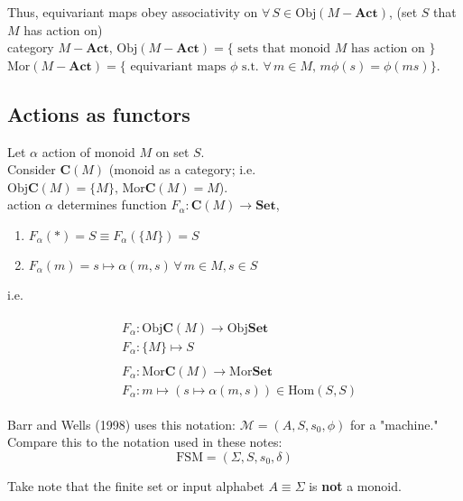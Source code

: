 \documentclass[10pt]{amsart}
\begin{document}
\begin{multicols*}{2}
Thus, equivariant maps obey associativity on $\forall \, S \in \text{Obj}(M-\mathbf{Act})$, (set $S$ that $M$ has action on) \\
category $M-\mathbf{Act}$, $\text{Obj}(M-\mathbf{Act}) = \lbrace \text{ sets that monoid $M$ has action on }\rbrace$ \\
 $\text{Mor}(M-\mathbf{Act}) = \lbrace \text{ equivariant maps $\phi$ s.t. } \forall \, m \in M, \, m\phi(s) = \phi(ms) \rbrace$.

\subsection{Actions as functors}

Let $\alpha$ action of monoid $M$ on set $S$. \\

Consider $\mathbf{C}(M)$ (monoid as a category; i.e. $\text{Obj}\mathbf{C}(M) = \lbrace M \rbrace, \, \text{Mor}\mathbf{C}(M) = M$). \\
action $\alpha$ determines function $F_{\alpha} : \mathbf{C}(M) \to \mathbf{Set}$, 
\begin{enumerate}
	\item $F_{\alpha}(*) = S \equiv F_{\alpha}(\lbrace M \rbrace ) = S$
	\item  $F_{\alpha}(m) = s \mapsto \alpha(m, s) \, \forall \, m \in M, s \in S$
\end{enumerate}
i.e.

\[
\begin{gathered}
\begin{aligned}
& F_{\alpha} : \text{Obj}\mathbf{C}(M) \to \text{Obj}\mathbf{Set} \\ 
& F_{\alpha} : \lbrace M \rbrace \mapsto S 
\end{aligned} \\
\begin{aligned}
& F_{\alpha} : \text{Mor}\mathbf{C}(M) \to \text{Mor}\textbf{Set} \\ 
& F_{\alpha} : m \mapsto (s\mapsto \alpha(m,s)) \in \text{Hom}(S,S)
\end{aligned}
\end{gathered}
\]

Barr and Wells (1998) \cite{BW1998} uses this notation: $\mathcal{M} = (A, S, s_0, \phi)$ for a "machine." Compare this to the notation used in these notes:
\[
\text{FSM} = (\Sigma, S, s_0, \delta)
\]

Take note that the finite set or input alphabet $A \equiv \Sigma$ is \textbf{not} a monoid. \\


\end{multicols*}
\end{document}
